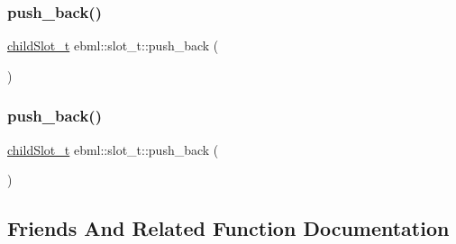 \mbox{\label{classebml_1_1slot__t_acdbb11a14ce186aff8ebb95b98296afb}} 
\subsubsection{\texorpdfstring{push\+\_\+back()}{push\_back()}\hspace{0.1cm}{\footnotesize\ttfamily [1/2]}}
{\footnotesize\ttfamily \mbox{\hyperlink{classebml_1_1childSlot__t}{child\+Slot\+\_\+t}} ebml\+::slot\+\_\+t\+::push\+\_\+back (\begin{DoxyParamCaption}\item[{const \mbox{\hyperlink{namespaceebml_adad533b7705a16bb360fe56380c5e7be}{ebml\+Element\+\_\+sp}} \&}]{ }\end{DoxyParamCaption})}

\mbox{\label{classebml_1_1slot__t_acdfefb7ae413147ae5904d59d888d52d}} 
\subsubsection{\texorpdfstring{push\+\_\+back()}{push\_back()}\hspace{0.1cm}{\footnotesize\ttfamily [2/2]}}
{\footnotesize\ttfamily \mbox{\hyperlink{classebml_1_1childSlot__t}{child\+Slot\+\_\+t}} ebml\+::slot\+\_\+t\+::push\+\_\+back (\begin{DoxyParamCaption}\item[{\mbox{\hyperlink{namespaceebml_adad533b7705a16bb360fe56380c5e7be}{ebml\+Element\+\_\+sp}} \&\&}]{ }\end{DoxyParamCaption})}



\subsection{Friends And Related Function Documentation}
\mbox{\label{classebml_1_1slot__t_a4df98a34a57f946e69b766054b391d08}} 
